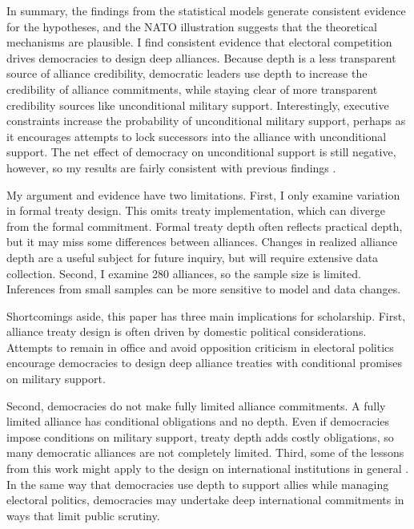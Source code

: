 \documentclass[12pt]{article}
\begin{document}
In summary, the findings from the statistical models generate consistent evidence for the hypotheses, and the NATO illustration suggests that the theoretical mechanisms are plausible. 
I find consistent evidence that electoral competition drives democracies to design deep alliances.  
Because depth is a less transparent source of alliance credibility, democratic leaders use depth to increase the credibility of alliance commitments, while staying clear of more transparent credibility sources like unconditional military support.
Interestingly, executive constraints increase the probability of unconditional military support, perhaps as it encourages attempts to lock successors into the alliance with unconditional support.
The net effect of democracy on unconditional support is still negative, however, so my results are fairly consistent with previous findings \citep{Mattes2012, Chibaetal2015, FjelstulReiter2019}.  


My argument and evidence have two limitations.
First, I only examine variation in formal treaty design. 
This omits treaty implementation, which can diverge from the formal commitment.   
Formal treaty depth often reflects practical depth, but it may miss some differences between alliances. 
Changes in realized alliance depth are a useful subject for future inquiry, but will require extensive data collection.
Second, I examine 280 alliances, so the sample size is limited. 
Inferences from small samples can be more sensitive to model and data changes. 


Shortcomings aside, this paper has three main implications for scholarship. 
First, alliance treaty design is often driven by domestic political considerations. 
Attempts to remain in office and avoid opposition criticism in electoral politics encourage democracies to design deep alliance treaties with conditional promises on military support. 


Second, democracies do not make fully limited alliance commitments. 
A fully limited alliance has conditional obligations and no depth.
Even if democracies impose conditions on military support, treaty depth adds costly obligations, so many democratic alliances are not completely limited.  
Third, some of the lessons from this work might apply to the design on international institutions in general \citep{DownesRocke1995, MartinSimmons1998, Koremenosetal2001, Thompson2010}.
In the same way that democracies use depth to support allies while managing electoral politics, democracies may undertake deep international commitments in ways that limit public scrutiny. 
\end{document}
